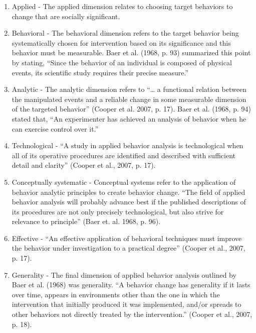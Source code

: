 \begin{enumerate}
\item Applied - The applied dimension relates to choosing target behaviors to change that are socially significant. 
\item Behavioral - The behavioral dimension refers to the target behavior being systematically chosen for intervention based on its significance and this behavior must be measurable.  Baer et al. (1968, p. 93) summarized this point by stating, ``Since the behavior of an individual is composed of physical events, its scientific study requires their precise measure.''
\item Analytic - The analytic dimension refers to ``… a functional relation between the manipulated events and a reliable change in some measurable dimension of the targeted behavior'' (Cooper et al. 2007, p. 17). Baer et al. (1968, p. 94) stated that, ``An experimenter has achieved an analysis of behavior when he can exercise control over it.''
\item Technological - ``A study in applied behavior analysis is technological when all of its operative procedures are identified and described with sufficient detail and clarity'' (Cooper et al., 2007, p. 17).
\item Conceptually systematic - Conceptual systems refer to the application of behavior analytic principles to create behavior change. ``The field of applied behavior analysis will probably advance best if the published descriptions of its procedures are not only precisely technological, but also strive for relevance to principle'' (Baer et. al. 1968, p. 96).
\item Effective - ``An effective application of behavioral techniques must improve the behavior under investigation to a practical degree'' (Cooper et al., 2007, p. 17).
\item Generality - The final dimension of applied behavior analysis outlined by Baer et al. (1968) was generality. ``A behavior change has generality if it lasts over time, appears in environments other than the one in which the intervention that initially produced it was implemented, and/or spreads to other behaviors not directly treated by the intervention.'' (Cooper et al., 2007, p. 18).
\end{enumerate}

